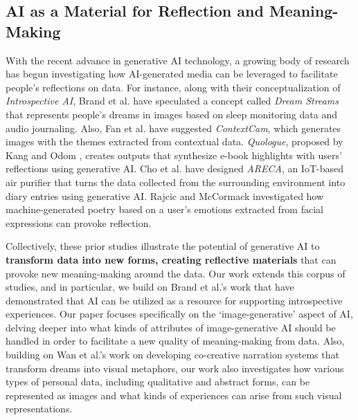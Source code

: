\subsection{AI as a Material for Reflection and Meaning-Making}
With the recent advance in generative AI technology, a growing body of research has begun investigating how AI-generated media can be leveraged to facilitate people’s reflections on data. For instance, along with their conceptualization of \textit{Introspective AI}, Brand et al. \cite{brand2021design} have speculated a concept called \textit{Dream Streams} that represents people’s dreams in images based on sleep monitoring data and audio journaling. Also, Fan et al. \cite{fan2024contextcam} have suggested \textit{ContextCam}, which generates images with the themes extracted from contextual data. \textit{Quologue}, proposed by Kang and Odom \cite{kang2024design}, creates outputs that synthesize e-book highlights with users’ reflections using generative AI. Cho et al. \cite{cho2023areca} have designed \textit{ARECA}, an IoT-based air purifier that turns the data collected from the surrounding environment into diary entries using generative AI. Rajcic and McCormack \cite{rajcic2020mirror} investigated how machine-generated poetry based on a user’s emotions extracted from facial expressions can provoke reflection.

Collectively, these prior studies illustrate the potential of generative AI to \textbf{transform data into new forms, creating reflective materials} that can provoke new meaning-making around the data. Our work extends this corpus of studies, and in particular, we build on Brand et al.’s work \cite{brand2021design} that have demonstrated that AI can be utilized as a resource for supporting introspective experiences. Our paper focuses specifically on the ‘image-generative’ aspect of AI, delving deeper into what kinds of attributes of image-generative AI should be handled in order to facilitate a new quality of meaning-making from data. Also, building on Wan et al.’s work \cite{wan2024metamorpheus} on developing co-creative narration systems that transform dreams into visual metaphors, our work also investigates how various types of personal data, including qualitative and abstract forms, can be represented as images and what kinds of experiences can arise from such visual representations.